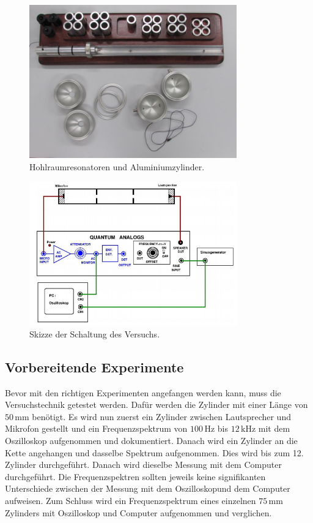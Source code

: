 \begin{figure}[H]
    \centering
    \includegraphics[width=0.8\textwidth]{build/Experiment.PNG}
    \caption{Hohlraumresonatoren und Aluminiumzylinder. \cite{Anleitung}}
    \label{fig:material}
\end{figure}

\begin{figure}[H]
    \centering
    \includegraphics[width=0.8\textwidth]{build/Schaltung.PNG}
    \caption{Skizze der Schaltung des Versuchs. \cite{Anleitung}}
    \label{fig:schaltung}
\end{figure}

\subsection{Vorbereitende Experimente}
\label{sec:vorbereitung}

Bevor mit den richtigen Experimenten angefangen werden kann, muss die Versuchstechnik getestet werden. Dafür werden die Zylinder mit einer Länge von $50 \, \mathrm{mm}$ benötigt. Es wird nun zuerst ein Zylinder zwischen Lautsprecher und Mikrofon gestellt und ein Frequenzspektrum von $100 \, \mathrm{Hz}$ bis $12 \, \mathrm{kHz}$ mit dem Oszilloskop aufgenommen und dokumentiert. Danach wird ein Zylinder an die Kette angehangen und dasselbe Spektrum aufgenommen. Dies wird bis zum 12. Zylinder durchgeführt. Danach wird dieselbe Messung mit dem Computer durchgeführt. Die Frequenzspektren sollten jeweils keine signifikanten Unterschiede zwischen der Messung mit dem Oszilloskopund dem Computer aufweisen. Zum Schluss wird ein Frequenzspektrum eines einzelnen $75 \, \mathrm{mm}$ Zylinders mit Oszilloskop und Computer aufgenommen und verglichen.

